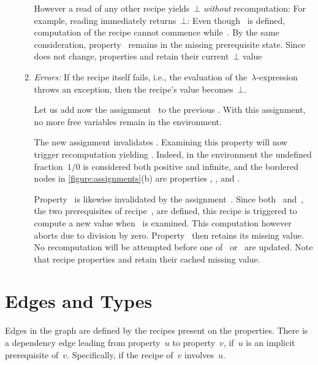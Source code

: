 \begin{enumerate}
\begin{enumerate}
          However a read of any other
          recipe yields~$⊥$ \emph{without} recomputation: For example, reading
           immediately returns~$⊥$: Even though~ is defined,
          computation of the recipe  cannot commence
          while~. By the same consideration, property~ remains
          in the missing prerequisite state. Since~ does not change,
          properties  and  retain their current~$⊥$ value

          \item\emph{Errors:} If the recipe itself fails, i.e., the \Java
          evaluation of the~$λ$-expression throws an exception, then the
          recipe's value becomes~$⊥$.

          Let us add now the assignment~ to the previous .
          With this assignment, no more free variables remain in the
          environment.

          The new assignment invalidates . Examining this property
          will now trigger recomputation yielding . Indeed, in the
           environment the undefined fraction~$1/0$ is considered
          both positive and infinite, and the bordered nodes in
          \cref{figure:assignments}(b) are properties , , 
           and . 

          Property~ is likewise invalidated by the assignment~.
          Since both~ and~, the two prerequisites of
          recipe~, are defined, this recipe is triggered to compute a
          new value when~ is examined. This computation however aborts
          due to division by zero. Property~ then retains its missing
          value. No recomputation will be attempted before one of~
          or~ are updated.  Note that recipe properties  and
           retain their cached missing value.
  \end{enumerate}
\end{enumerate}

\section{Edges and Types}

Edges in the graph are defined by the recipes present on the properties. There
is a dependency edge leading from property~$u$ to property~$v$, if~$u$ is an
implicit prerequisite of~$v$. Specifically, if the recipe of~$v$ involves~$u$.

